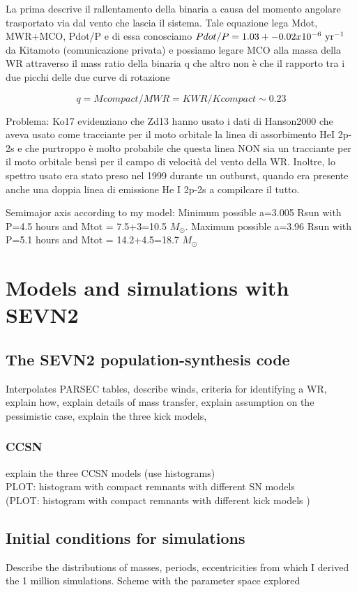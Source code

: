 \documentclass[a4paper,titlepage]{book}     	%
\newcommand{\sun}{\ensuremath{_\odot}}
\newcommand{\msun}{\ensuremath{M\sun}}
\begin{document}
La prima descrive il rallentamento della binaria a causa del momento angolare trasportato via dal vento che lascia il sistema. Tale equazione lega Mdot, MWR+MCO, Pdot/P e di essa conosciamo $Pdot/P = 1.03+- 0.02 x 10^{-6} ~ \rm yr^{-1}$ da Kitamoto (comunicazione privata) e possiamo legare MCO alla massa della WR attraverso il mass ratio della binaria q che altro non è che il rapporto tra i due picchi delle due curve di rotazione

\[q = Mcompact/MWR = KWR / Kcompact \sim 0.23\] 

Problema: Ko17 evidenziano che Zd13 hanno usato i dati di Hanson2000 che aveva usato come tracciante per il moto orbitale la linea di assorbimento HeI 2p-2s e che purtroppo è molto probabile che questa linea NON sia un tracciante per il moto orbitale bensì per il campo di velocità del vento della WR. Inoltre, lo spettro usato era stato preso nel 1999 durante un outburst, quando era presente anche una doppia linea di emissione He I 2p-2s a compilcare il tutto. 




Semimajor axis according to my model: Minimum possible a=3.005 Rsun with P=4.5 hours and Mtot = 7.5+3=10.5 \msun .  Maximum possible a=3.96 Rsun with P=5.1 hours and Mtot = 14.2+4.5=18.7 \msun 


\chapter{Models and simulations with SEVN2}
\section{The SEVN2 population-synthesis code}\label{sec:SEVN}
Interpolates PARSEC tables, describe winds, criteria for identifying a WR, explain how, explain details of mass transfer, explain assumption on the pessimistic case, explain the three kick models, 
\subsection{CCSN}\label{subsec:SNmodels}
explain the three CCSN models (use histograms)\\
PLOT: histogram with compact remnants with different SN models\\
(PLOT: histogram with compact remnants with different kick models )

\section{Initial conditions for simulations}
Describe the distributions of masses, periods, eccentricities from which I derived the 1 million simulations. Scheme with the parameter space explored
\end{document}
